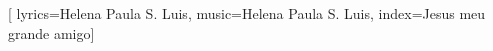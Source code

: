 %

\setcounter{songnum}{80}

[
        lyrics={Helena Paula S. Luis}, 
        music={Helena Paula S. Luis},
        index={Jesus meu grande amigo}]

